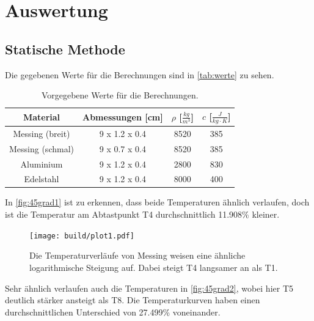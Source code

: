 \section{Auswertung}
\label{sec:Auswertung}

\subsection{Statische Methode}
Die gegebenen Werte für die Berechnungen sind in \autoref{tab:werte} zu sehen.

\begin{table}
    \centering
    \caption{Vorgegebene Werte für die Berechnungen.}
    \begin{tabular}{c|c|c|c}
        Material & Abmessungen [cm] & $\rho$ [$\frac{kg}{m^3}$] & $c$ [$\frac{J}{kg\cdot K}$]\\
        \midrule
        Messing (breit) & 9 x 1.2 x 0.4 & 8520 & 385\\
        Messing (schmal) & 9 x 0.7 x 0.4 & 8520 & 385\\
        Aluminium & 9 x 1.2 x 0.4 & 2800 & 830\\
        Edelstahl & 9 x 1.2 x 0.4 & 8000 & 400\\
    \end{tabular}
    \label{tab:werte}
\end{table}

In \autoref{fig:45grad1} ist zu erkennen, dass beide Temperaturen ähnlich verlaufen, doch ist die Temperatur am Abtastpunkt T4 durchschnittlich 11.908\% kleiner.

\begin{figure}
    \centering
    \texttt{[image: build/plot1.pdf]}
    \caption{Die Temperaturverläufe von Messing  weisen eine ähnliche logarithmische Steigung auf. Dabei steigt T4 langsamer an als T1.}
    \label{fig:45grad1}
\end{figure}

\newpage
Sehr ähnlich verlaufen auch die Temperaturen in \autoref{fig:45grad2}, wobei hier T5 deutlich stärker ansteigt als T8.
Die Temperaturkurven haben einen durchschnittlichen Unterschied von 27.499\% voneinander.

